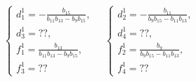 \begin{equation*}
    \begin{cases}
        d_1^1 = -\frac{b_{15}}{b_{11} b_{13} - b_9 b_{15}}, \\
        d_3^1 = ??, \\
        f_1^1 = \frac{b_{13}}{b_{11} b_{13} - b_9 b_{15}}, \\
        f_3^1 = ??
    \end{cases} \quad
    \begin{cases}
        d_2^1 = -\frac{b_{11}}{b_9 b_{15} - b_{11} b_{13}}, \\
        d_4^1 = ??, \\
        f_2^1 = \frac{b_9}{b_9 b_{15} - b_{11} b_{13}}, \\
        f_4^1 = ??
    \end{cases}
\end{equation*}

